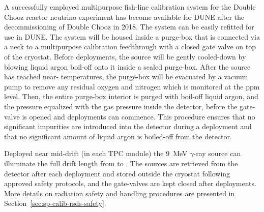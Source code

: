 A successfully employed multipurpose fish-line calibration
system
 for the Double Chooz
reactor neutrino experiment has become available for DUNE after
the decommissioning of Double Chooz in 2018. The system can be
easily refitted for use in DUNE. The system will be housed inside
a purge-box that is connected via a neck to a multipurpose
calibration feedthrough with a closed gate valve on top of the
cryostat. Before deployments, the source will be gently cooled-down by blowing liquid argon boil-off onto it inside a sealed purge-box. After the source has reached 
near- temperatures, the purge-box will be evacuated by a vacuum pump to remove any residual oxygen and nitrogen which is monitored at the ppm level. Then, the entire purge-box interior is purged with boil-off liquid argon, and the pressure equalized with the gas pressure inside the detector, before the gate-valve is opened and deployments can commence. This procedure ensures that no significant impurities are introduced into the detector during a deployment and that no significant amount of liquid argon is boiled-off from the detector. 

Deployed near mid-drift (in each TPC module) the \SI{9}{\MeV}
$\gamma$-ray source can illuminate the full drift length from
 to . The sources are retrieved from the
detector after each deployment and stored outside the cryostat following approved safety protocols, and the gate-valves are kept closed after deployments. More details on radiation safety and handling procedures are presented in Section~\ref{sec:sp-calib-rsds-safety}.

